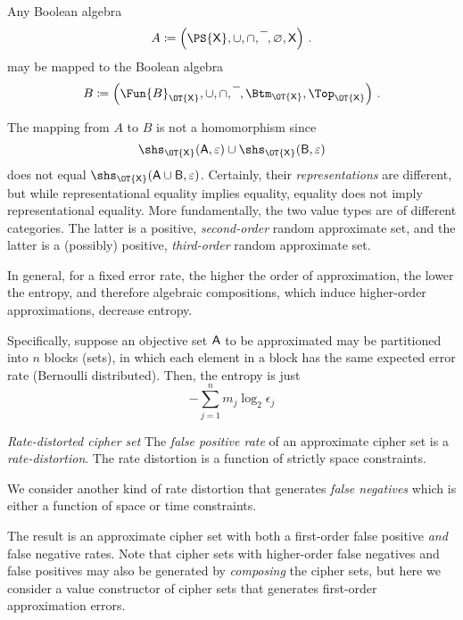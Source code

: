 \documentclass[ ../main.tex]{subfiles}
\begin{document}
Any Boolean algebra
\begin{equation}
A \coloneqq \left(\PS{\Set{X}}, \SetUnion, \SetIntersection, \SetComplement, \EmptySet, \Set{X}\right)\,.
\end{equation}
may be mapped to the Boolean algebra
\begin{equation}
B \coloneqq \left(\Fun{B}_{\OT{\Set{X}}}, \SetUnion, \SetIntersection, \SetComplement, \Btm_{\OT{\Set{X}}}, \Top_{\OT{\Set{X}}}\right)\,.
\end{equation}

The mapping from $A$ to $B$ is not a homomorphism since
\begin{equation}
	\shs_{\OT{\Set{X}}}(\Set{A},\fprate) \SetUnion \shs_{\OT{\Set{X}}}(\Set{B},\fprate)
\end{equation}
does not equal $\shs_{\OT{\Set{X}}}(\Set{A} \SetUnion \Set{B},\fprate)$.
Certainly, their \emph{representations} are different, but while representational equality implies equality, equality does not imply representational equality.
More fundamentally, the two value types are of different categories. The latter is a positive, \emph{second-order} random approximate set, and the latter is a (possibly) positive, \emph{third-order} random approximate set.

In general, for a fixed error rate, the higher the order of approximation, the lower the entropy, and therefore algebraic compositions, which induce higher-order approximations, decrease entropy.

Specifically, suppose an objective set $\Set{A}$ to be approximated may be partitioned into $n$ blocks (sets), in which each element in a block has the same expected error rate (Bernoulli distributed).
Then, the entropy is just
\begin{equation}
	-\sum_{j=1}^{n} m_j \log_2 \epsilon_j
\end{equation}


\emph{Rate-distorted cipher set}
The \emph{false positive rate} of an approximate cipher set is a \emph{rate-distortion}.
The rate distortion is a function of strictly space constraints.

We consider another kind of rate distortion that generates \emph{false negatives} which is either a function of space or time constraints.

The result is an approximate cipher set with both a first-order false positive \emph{and} false negative rates.
Note that cipher sets with higher-order false negatives and false positives may also be generated by \emph{composing} the cipher sets, but here we consider a value constructor of cipher sets that generates first-order approximation errors.
\end{document}
